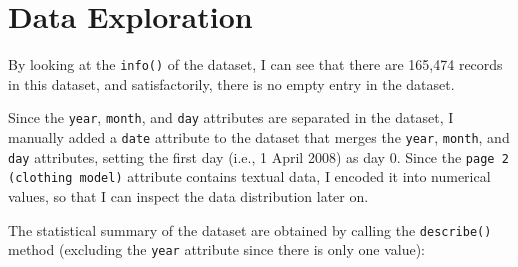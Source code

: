 \documentclass[12pt,twoside,a4paper]{article}
\begin{document}

\section{Data Exploration}

By looking at the \texttt{info()} of the dataset, I can see that there are 165,474 records in this dataset, and satisfactorily, there is no empty entry in the dataset.

Since the \texttt{year}, \texttt{month}, and \texttt{day} attributes are separated in the dataset, I manually added a \texttt{date} attribute to the dataset that merges the \texttt{year}, \texttt{month}, and \texttt{day} attributes, setting the first day (i.e., 1 April 2008) as day 0. Since the \texttt{page 2 (clothing model)} attribute contains textual data, I encoded it into numerical values, so that I can inspect the data distribution later on.

The statistical summary of the dataset are obtained by calling the \texttt{describe()} method (excluding the \texttt{year} attribute since there is only one value):
\end{document}

